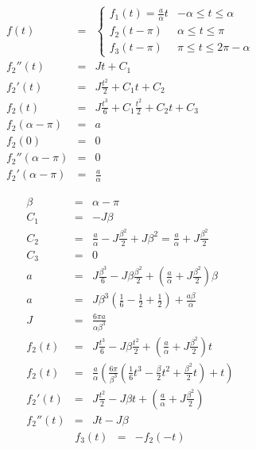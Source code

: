 \documentclass[a4,draft]{article}
\begin{document}
\begin{eqnarray}
  f(t) &=& \begin{cases} 
    f_1(t)=\frac{a}{\alpha}t & -\alpha \leq t \le  \alpha\\
    f_2(t - \pi) & \alpha \leq t \le  \pi \\
    f_3(t - \pi) &  \pi \leq t \le  2\pi -\alpha
  \end{cases}\\
  f_2''(t) &=& Jt + C_1\\
  f_2'(t) &=& J\frac{t^2}{2} + C_1t + C_2 \\
  f_2(t) &=& J\frac{t^3}{6} + C_1\frac{t^2}{2} + C_2t + C_3 \\
  f_2(\alpha - \pi) &=& a \\
  f_2(0) &=& 0 \\
  f_2''(\alpha - \pi) &=& 0 \\
  f_2'(\alpha - \pi) &=& \frac{a}{\alpha}
\end{eqnarray}

\begin{eqnarray}
  \beta &=& \alpha - \pi \\
  C_1 &=& -J\beta \\
  C_2 &=& \frac{a}{\alpha} - J\frac{\beta^2}{2} +J\beta^2 = \frac{a}{\alpha} + J\frac{\beta^2}{2}\\
  C_3 &=& 0 \\
  a &=&J\frac{\beta^3}{6} -J\beta\frac{\beta^2}{2} + \left(\frac{a}{\alpha} + J\frac{\beta^2}{2}\right)\beta \\
  a &=& J\beta^3\left(\frac{1}{6} - \frac{1}{2} + \frac{1}{2}\right) + \frac{a\beta}{\alpha} \\
  J &=& \frac{6\pi a}{\alpha \beta^3} \\
  f_2(t) &=& J\frac{t^3}{6} -J\beta\frac{t^2}{2} + \left(\frac{a}{\alpha} + J\frac{\beta^2}{2}\right) t \\
  f_2(t) &=& \frac{a}{\alpha} \left( \frac{6\pi}{\beta^3}\left(\frac{1}{6}t^3 -\frac{\beta}{2}t^2 + \frac{\beta^2}{2} t \right) +  t \right) \\
  f_2'(t) &=& J\frac{t^2}{2} -J\beta t + \left(\frac{a}{\alpha} + J\frac{\beta^2}{2}\right) \\
  f_2''(t) &=& J t - J\beta
\end{eqnarray}
\begin{eqnarray}
  f_3(t) &=& -f_2(-t)
\end{eqnarray}
\end{document}
